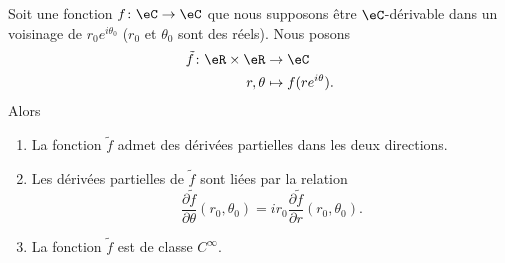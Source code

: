 \begin{proposition}      \label{PROPooAGGMooIVQFQB}
	Soit une fonction \( f\colon \eC\to \eC\) que nous supposons être \( \eC\)-dérivable dans un voisinage de \( r_0 e^{i\theta_0}\) (\( r_0\) et \( \theta_0\) sont des réels). Nous posons
	\begin{equation}
		\begin{aligned}
			\tilde f\colon \eR\times \eR & \to \eC                   \\
			r,\theta                     & \mapsto f(r e^{i\theta}).
		\end{aligned}
	\end{equation}
	Alors
	\begin{enumerate}
		\item       \label{ITEMooRTYYooSTgTAQ}
		      La fonction \( \tilde f\) admet des dérivées partielles dans les deux directions.
		\item       \label{ITEMooDHXTooBjxwjY}
		      Les dérivées partielles de \( \tilde f\) sont liées par la relation
		      \begin{equation}
			      \frac{ \partial \tilde f }{ \partial \theta }(r_0,\theta_0)=ir_0\frac{ \partial \tilde f }{ \partial r }(r_0,\theta_0).
		      \end{equation}
		\item       \label{ITEMooUUXTooZoDMHI}
		      La fonction \( \tilde f\) est de classe \(  C^{\infty}\).
	\end{enumerate}
\end{proposition}

